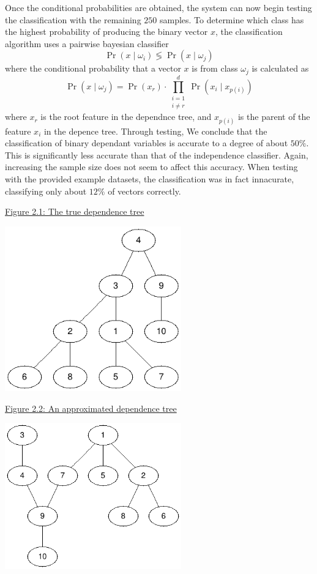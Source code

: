 \documentclass[11pt,english]{article}
\begin{document}
Once the conditional probabilities are obtained, the system can now begin testing the classification with the remaining $250$ samples.
To determine which class
has the highest probability of producing the binary vector $x$, the classification algorithm uses a pairwise bayesian classifier
$$\Pr(x\mid\omega_i)\lessgtr\Pr(x\mid\omega_j)$$ where the conditional
probability that a vector $x$ is from class $\omega_j$ is calculated as
$$\Pr(x\mid\omega_j) = \Pr(x_r)\cdot\prod_{\substack{i=1\\ i\neq r}}^{d}\Pr(x_i\mid
x_{p(i)})$$
where $x_r$ is the root feature in the dependnce tree, and $x_{p(i)}$ is the parent of
the feature $x_i$ in the depence tree.
Through testing, We conclude that the classification of binary dependant variables is accurate to a degree of about $50\%$. 
This is significantly less accurate than that of the independence classifier. Again, increasing the sample size does not seem to affect
this accuracy. When testing with the provided example datasets, the
classification was in fact innacurate, classifying only about $12\%$ of vectors correctly.



\pagebreak
\underline{Figure 2.1: The true dependence tree}\\
\begin{center}
\includegraphics[width=3in]{tree.png} \\
\end{center}
\vspace{5mm}
\underline{Figure 2.2: An approximated dependence tree} \\
\begin{center}
\includegraphics[width=3in]{est-tree.png}
\end{center}
\end{document}
